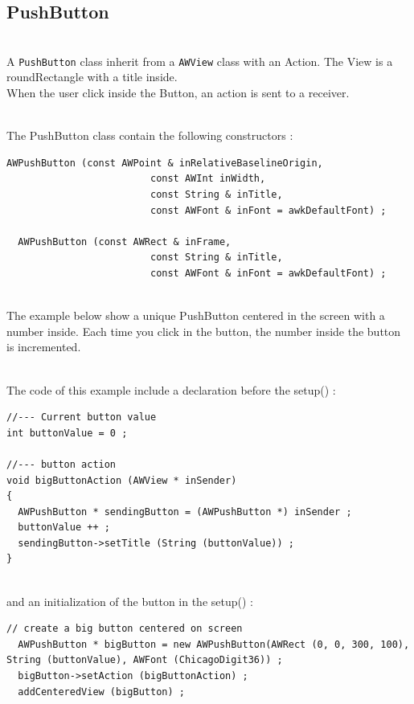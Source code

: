 \documentclass[a4paper,11pt]{extarticle}
\begin{document}
\newpage
\subsection{PushButton}

~\\ A \texttt{PushButton} class inherit from a \texttt{AWView} class with an Action. The View is a roundRectangle with a title inside.
~\\ When the user click inside the Button, an action is sent to a receiver.

~\\ The PushButton class contain the following constructors :

\begin{lstlisting}[language=Arduinonl]
  AWPushButton (const AWPoint & inRelativeBaselineOrigin,
                         const AWInt inWidth,
                         const String & inTitle,
                         const AWFont & inFont = awkDefaultFont) ;
  
  AWPushButton (const AWRect & inFrame,
                         const String & inTitle,
                         const AWFont & inFont = awkDefaultFont) ;
\end{lstlisting}

~\\ The example below show a unique PushButton centered in the screen with a number inside. Each time you click in the button, the number inside the button is incremented.

~\\ The code of this example include a declaration before the setup() :

\begin{lstlisting}[language=Arduinonl]
//--- Current button value
int buttonValue = 0 ;

//--- button action
void bigButtonAction (AWView * inSender)
{
  AWPushButton * sendingButton = (AWPushButton *) inSender ;
  buttonValue ++ ;
  sendingButton->setTitle (String (buttonValue)) ;
}
\end{lstlisting}

~\\ and an initialization of the button in the setup() :

\begin{lstlisting}[language=Arduinonl]
 // create a big button centered on screen
  AWPushButton * bigButton = new AWPushButton(AWRect (0, 0, 300, 100), String (buttonValue), AWFont (ChicagoDigit36)) ;
  bigButton->setAction (bigButtonAction) ;
  addCenteredView (bigButton) ;
\end{lstlisting}
\end{document}
